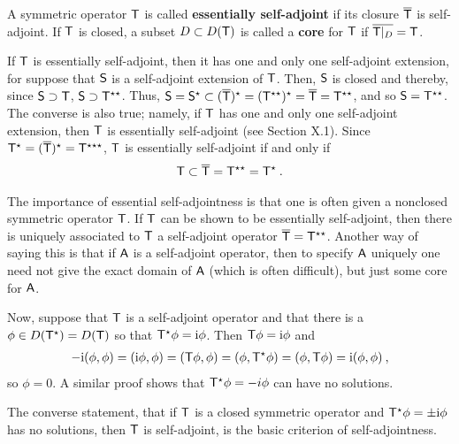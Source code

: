 \begin{definition}
A symmetric operator $\mathsf{T}$ is called \textbf{essentially self-adjoint} if its closure $\overline{\mathsf{T}}$ is self-adjoint. If $\mathsf{T}$ is closed, a subset $D \subset D(\mathsf{T})$ is called a \textbf{core} for $\mathsf{T}$ if $\overline{\mathsf{T}|_{D}} = \mathsf{T}$. 
\end{definition}

If $\mathsf{T}$ is essentially self-adjoint, then it has one and only one self-adjoint extension, for suppose that $\mathsf{S}$ is a self-adjoint extension of $\mathsf{T}$. Then, $\mathsf{S}$ is closed and thereby, since $\mathsf{S} \supset \mathsf{T}$, $\mathsf{S} \supset \mathsf{T}^{\star \star}$. Thus, $\mathsf{S} = \mathsf{S}^\star \subset (\overline{\mathsf{T}})^\star = (\mathsf{T}^{\star \star})^\star  = \overline{\mathsf{T}}= \mathsf{T}^{\star \star}$, and so
$\mathsf{S} = \mathsf{T}^{\star \star}$. The converse is also true; namely, if $\mathsf{T}$ has one and only one self-adjoint extension, then $\mathsf{T}$ is essentially self-adjoint (see Section X.1). Since
$\mathsf{T}^{\star} = (\mathsf{\overline{T}} )^{\star} = \mathsf{T}^{\star \star \star}$, $\mathsf{T}$ is essentially self-adjoint if and only if
\begin{align}
    \mathsf{T} \subset  \overline{ \mathsf{T}} = \mathsf{T}^{\star \star} = \mathsf{T}^{\star} \:.
\end{align}

The importance of essential self-adjointness is that one is often given a nonclosed symmetric operator $\mathsf{T}$. If $\mathsf{T}$ can be shown to be essentially self-adjoint, then there is uniquely associated to $\mathsf{T}$ a self-adjoint operator $\overline{\mathsf{T}} = \mathsf{T}^{\star \star}$.
Another way of saying this is that if $\mathsf{A}$ is a self-adjoint operator, then to specify $\mathsf{A}$ uniquely one need not give the exact domain of $\mathsf{A}$ (which is often difficult), but just some core for $\mathsf{A}$.

Now, suppose that $\mathsf{T}$ is a self-adjoint operator and that there is a $\phi \in D(\mathsf{T}^{\star}) = D(\mathsf{T}) $ so that $\mathsf{T}^{\star} \phi = \mathrm{i} \phi$. Then $\mathsf{T} \phi = \mathrm{i} \phi$ and
\begin{align}
    - \mathrm{i} (\phi, \phi) =(\mathrm{i} \phi, \phi) = (\mathsf{T} \phi, \phi) = (\phi, \mathsf{T}^\star \phi ) = (\phi, \mathsf{T} \phi) = \mathrm{i} (\phi, \phi) \:,
\end{align}
so $\phi = 0$. A similar proof shows that $\mathsf{T}^\star \phi = -i \phi$ can have no solutions. 

The converse statement, that if $\mathsf{T}$ is a closed symmetric operator and $\mathsf{T}^\star \phi = \pm \mathrm{i} \phi$ has no solutions, then $\mathsf{T}$ is self-adjoint, is the basic criterion of self-adjointness.

